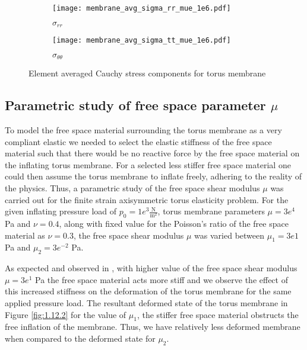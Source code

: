 \begin{figure}[ht!]
\centering 
\begin{subfigure}[b]{0.49\textwidth}
\centering
\texttt{[image: membrane\_avg\_sigma\_rr\_mue\_1e6.pdf]}
\caption{$\sigma_{rr}$}
\label{fig:1.11.1}
\end{subfigure}
\begin{subfigure}[b]{0.49\textwidth}
\centering
\texttt{[image: membrane\_avg\_sigma\_tt\_mue\_1e6.pdf]}
\caption{$\sigma_{\theta \theta}$}
\label{fig:1.11.2}
\end{subfigure}
\caption{Element averaged Cauchy stress components for torus membrane}
\label{fig:1.11}
\end{figure} 

\subsection{Parametric study of free space parameter $\mu$}
To model the free space material surrounding the torus membrane as a very compliant elastic we needed to select the elastic stiffness of the free space material such that there would be no reactive force by the free space material on the inflating torus membrane. For a selected less stiffer free space material one could then assume the torus membrane to inflate freely, adhering to the reality of the physics. Thus, a parametric study of the free space shear modulus $\mu$ was carried out for the finite strain axisymmetric torus elasticity problem. For the given inflating pressure load of $p_0 = 1e^{3} \frac{\text{N}}{\text{m}^2}$, torus membrane parameters $\mu = 3e^4$ Pa and $\nu = 0.4$, along with fixed value for the Poisson's ratio of the free space material as $\nu = 0.3$, the free space shear modulus $\mu$ was varied between $\mu_1 = 3e1$ Pa and $\mu_2 = 3e^{-2}$ Pa. \par 

As expected and observed in , with higher value of the free space shear modulus $\mu = 3e^{1}$ Pa the free space material acts more stiff and we observe the effect of this increased stiffness on the deformation of the torus membrane for the same applied pressure load. The resultant deformed state of the torus membrane in Figure \eqref{fig:1.12.2} for the value of $\mu_1$, the stiffer free space material obstructs the free inflation of the membrane. Thus, we have relatively less deformed membrane when compared to the deformed state for $\mu_2$. \par 

